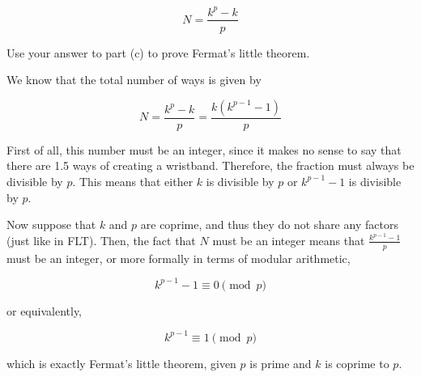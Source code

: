 \documentclass[11pt]{article}
\begin{document}
\begin{Parts}
\begin{solution}
        \[ N = \frac{k^p - k}{p}\]
      \end{solution}

    \Part Use your answer to part (c) to prove Fermat's little theorem.


    \begin{solution}
      We know that the total number of ways is given by 

      \[ N = \frac{k^p - k}{p} = \frac{k(k^{p-1} - 1)}{p}\]

      First of all, this number must be an integer, since it makes no sense to say that there are 1.5 ways of creating a wristband. Therefore, the fraction must always be divisible by $p$. This means that either $k$ is divisible by $p$ or $k^{p-1} - 1$ is divisible by $p$. 

      Now suppose that $k$ and $p$ are coprime, and thus they do not share any factors (just like in FLT). Then, the fact that $N$ must be an integer means that $\frac{k^{p-1} - 1}{p}$ must be an integer, or more formally in terms of modular arithmetic, 

      \[ k^{p-1} - 1 \equiv 0 \pmod{p}\]

      or equivalently, 

      \[ k^{p-1} \equiv 1 \pmod{p}\] 

      which is exactly Fermat's little theorem, given $p$ is prime and $k$ is coprime to $p$. 
    \end{solution}
\end{Parts}
\pagebreak
{}
\end{document}
